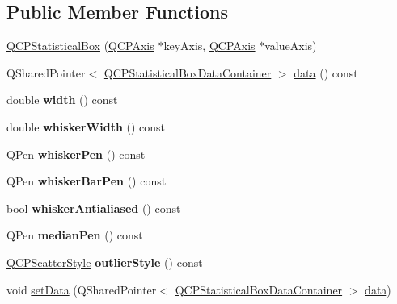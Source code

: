 \subsection*{Public Member Functions}
\begin{DoxyCompactItemize}
\item 
\hyperlink{class_q_c_p_statistical_box_a75c2b3e7fcd0741cc981693a2ba63b27}{Q\+C\+P\+Statistical\+Box} (\hyperlink{class_q_c_p_axis}{Q\+C\+P\+Axis} $\ast$key\+Axis, \hyperlink{class_q_c_p_axis}{Q\+C\+P\+Axis} $\ast$value\+Axis)
\item 
Q\+Shared\+Pointer$<$ \hyperlink{class_q_c_p_data_container}{Q\+C\+P\+Statistical\+Box\+Data\+Container} $>$ \hyperlink{class_q_c_p_statistical_box_a728e501413eaf191544014173d52dfbc}{data} () const
\item 
\mbox{\label{class_q_c_p_statistical_box_ae589b7481dec6ef8e50ebb6492d296f1}} 
double {\bfseries width} () const
\item 
\mbox{\label{class_q_c_p_statistical_box_aacfa6686c7cf4af18794ec02354f4782}} 
double {\bfseries whisker\+Width} () const
\item 
\mbox{\label{class_q_c_p_statistical_box_a67e5144f07645fe25c31001c460817fc}} 
Q\+Pen {\bfseries whisker\+Pen} () const
\item 
\mbox{\label{class_q_c_p_statistical_box_a47ed9ad9d2ca65640319a2f071982ed4}} 
Q\+Pen {\bfseries whisker\+Bar\+Pen} () const
\item 
\mbox{\label{class_q_c_p_statistical_box_a2015a8ea758cf65a41d4a6c52a20696b}} 
bool {\bfseries whisker\+Antialiased} () const
\item 
\mbox{\label{class_q_c_p_statistical_box_af767bc7b6b477d005535314b35aca683}} 
Q\+Pen {\bfseries median\+Pen} () const
\item 
\mbox{\label{class_q_c_p_statistical_box_aef92e38fcb8e5041a44c2e01886e3b66}} 
\hyperlink{class_q_c_p_scatter_style}{Q\+C\+P\+Scatter\+Style} {\bfseries outlier\+Style} () const
\item 
void \hyperlink{class_q_c_p_statistical_box_a08a6da55822bad825ee25a8069b9b52f}{set\+Data} (Q\+Shared\+Pointer$<$ \hyperlink{class_q_c_p_data_container}{Q\+C\+P\+Statistical\+Box\+Data\+Container} $>$ \hyperlink{class_q_c_p_statistical_box_a728e501413eaf191544014173d52dfbc}{data})

\end{DoxyCompactItemize}
